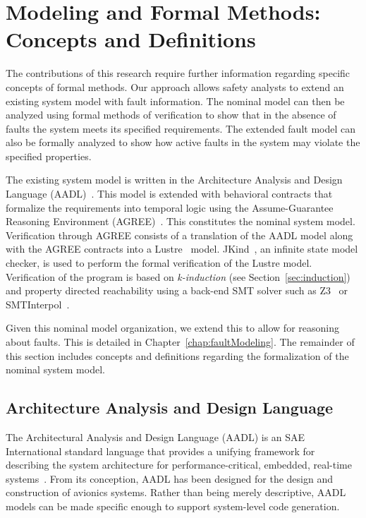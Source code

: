 \section{Modeling and Formal Methods: Concepts and Definitions}
\label{sec:concepts}
The contributions of this research require further information regarding specific concepts of formal methods. Our approach allows safety analysts to extend an existing system model with fault information. The nominal model can then be analyzed using formal methods of verification to show that in the absence of faults the system meets its specified requirements. The extended fault model can also be formally analyzed to show how active faults in the system may violate the specified properties. 

The existing system model is written in the Architecture Analysis and Design Language (AADL)~\cite{AADL_Standard}. This model is extended with behavioral contracts that formalize the requirements into temporal logic using the Assume-Guarantee Reasoning Environment (AGREE)~\cite{cofer2012compositional}. This constitutes the nominal system model. Verification through AGREE consists of a translation of the AADL model along with the AGREE contracts into a Lustre~\cite{Halbwachs91:IEEE} model. JKind~\cite{2017arXiv171201222G}, an infinite state model checker, is used to perform the formal verification of the Lustre model. Verification of the program is based on {\em k-induction} (see Section~\ref{sec:induction}) and property directed reachability using a back-end SMT solver such as Z3~\cite{z3} or SMTInterpol~\cite{smtInterpol}. 

Given this nominal model organization, we extend this to allow for reasoning about faults. This is detailed in Chapter~\ref{chap:faultModeling}. The remainder of this section includes concepts and definitions regarding the formalization of the nominal system model. 

\subsection{Architecture Analysis and Design Language}
The Architectural Analysis and Design Language (AADL) is an SAE International standard language that provides a unifying framework for describing the system architecture for performance-critical, embedded, real-time systems~\cite{AADL_Standard,FeilerModelBasedEngineering2012}. From its conception, AADL has been designed for the design and construction of avionics systems.  Rather than being merely descriptive, AADL models can be made specific enough to support system-level code generation.  
 
